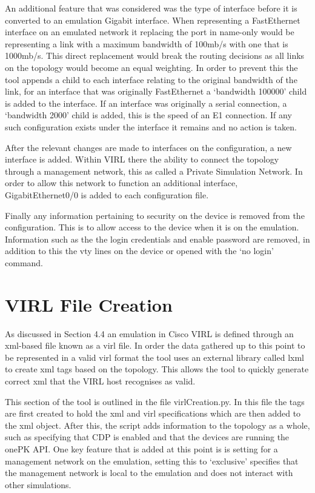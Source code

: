 \documentclass[11pt]{report}
\begin{document}
An additional feature that was considered was the type of interface before it is converted to an emulation Gigabit interface. When representing a FastEthernet interface on an emulated network it replacing the port in name-only would be representing a link with a maximum bandwidth of 100mb/s with one that is 1000mb/s. This direct replacement would break the routing decisions as all links on the topology would become an equal weighting. In order to prevent this the tool appends a child to each interface relating to the original bandwidth of the link, for an interface that was originally FastEthernet a `bandwidth 100000' child is added to the interface. If an interface was originally a serial connection, a `bandwidth 2000' child is added, this is the speed of an E1 connection. If any such configuration exists under the interface it remains and no action is taken.

After the relevant changes are made to interfaces on the configuration, a new interface is added. Within VIRL there the ability to connect the topology through a management network, this as called a Private Simulation Network. In order to allow this network to function an additional interface, GigabitEthernet0/0 is added to each configuration file.

Finally any information pertaining to security on the device is removed from the configuration. This is to allow access to the device when it is on the emulation. Information such as the the login credentials and enable password are removed, in addition to this the vty lines on the device or opened with the `no login' command.

\section{VIRL File Creation}

As discussed in Section 4.4 an emulation in Cisco VIRL is defined through an xml-based file known as a virl file. In order the data gathered up to this point to be represented in a valid virl format the tool uses an external library called lxml \citep{lxml} to create xml tags based on the topology. This allows the tool to quickly generate correct xml that the VIRL host recognises as valid.

This section of the tool is outlined in the file virlCreation.py. In this file the tags are first created to hold the xml and virl specifications which are then added to the xml object. After this, the script adds information to the topology as a whole, such as specifying that CDP is enabled and that the devices are running the onePK API. One key feature that is added at this point is is setting for a management network on the emulation, setting this to `exclusive' specifies that the management network is local to the emulation and does not interact with other simulations.
\end{document}
